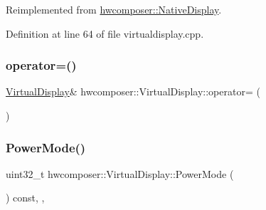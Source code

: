 Reimplemented from \mbox{\hyperlink{classhwcomposer_1_1NativeDisplay_afea85ea07de4c4985b611873dac9af50}{hwcomposer\+::\+Native\+Display}}.



Definition at line 64 of file virtualdisplay.\+cpp.


\begin{DoxyCode}{0}
\end{DoxyCode}
\mbox{\label{classhwcomposer_1_1VirtualDisplay_a91b8eb8d9a3339e4623e9147b26a3f2d}} 
\subsubsection{\texorpdfstring{operator=()}{operator=()}}
{\footnotesize\ttfamily \mbox{\hyperlink{classhwcomposer_1_1VirtualDisplay}{Virtual\+Display}}\& hwcomposer\+::\+Virtual\+Display\+::operator= (\begin{DoxyParamCaption}\item[{const \mbox{\hyperlink{classhwcomposer_1_1VirtualDisplay}{Virtual\+Display}} \&}]{ }\end{DoxyParamCaption})\hspace{0.3cm}{\ttfamily [delete]}}

\mbox{\label{classhwcomposer_1_1VirtualDisplay_a81f29d5b1642bb5f9dfc84fdfc497e8a}} 
\subsubsection{\texorpdfstring{Power\+Mode()}{PowerMode()}}
{\footnotesize\ttfamily uint32\+\_\+t hwcomposer\+::\+Virtual\+Display\+::\+Power\+Mode (\begin{DoxyParamCaption}{ }\end{DoxyParamCaption}) const\hspace{0.3cm}{\ttfamily [inline]}, {\ttfamily [override]}, {\ttfamily [virtual]}}



